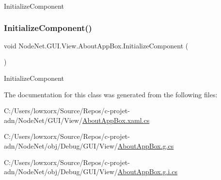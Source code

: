 Initialize\+Component 

\mbox{\label{class_node_net_1_1_g_u_i_1_1_view_1_1_about_app_box_a89a3badd7c39959698500e9592345ed8}} 
\subsubsection{\texorpdfstring{Initialize\+Component()}{InitializeComponent()}\hspace{0.1cm}{\footnotesize\ttfamily [2/2]}}
{\footnotesize\ttfamily void Node\+Net.\+G\+U\+I.\+View.\+About\+App\+Box.\+Initialize\+Component (\begin{DoxyParamCaption}{ }\end{DoxyParamCaption})}



Initialize\+Component 



The documentation for this class was generated from the following files\+:\begin{DoxyCompactItemize}
\item 
C\+:/\+Users/lowxorx/\+Source/\+Repos/c-\/projet-\/adn/\+Node\+Net/\+G\+U\+I/\+View/\hyperlink{_about_app_box_8xaml_8cs}{About\+App\+Box.\+xaml.\+cs}\item 
C\+:/\+Users/lowxorx/\+Source/\+Repos/c-\/projet-\/adn/\+Node\+Net/obj/\+Debug/\+G\+U\+I/\+View/\hyperlink{_about_app_box_8g_8cs}{About\+App\+Box.\+g.\+cs}\item 
C\+:/\+Users/lowxorx/\+Source/\+Repos/c-\/projet-\/adn/\+Node\+Net/obj/\+Debug/\+G\+U\+I/\+View/\hyperlink{_about_app_box_8g_8i_8cs}{About\+App\+Box.\+g.\+i.\+cs}\end{DoxyCompactItemize}
